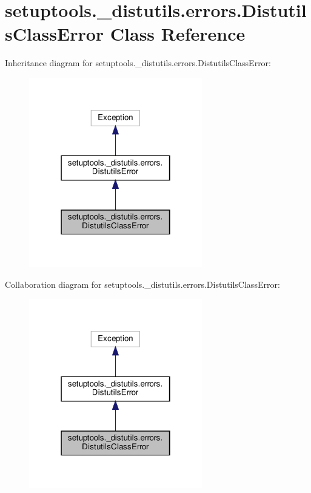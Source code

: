 \hypertarget{classsetuptools_1_1__distutils_1_1errors_1_1DistutilsClassError}{}\section{setuptools.\+\_\+distutils.\+errors.\+Distutils\+Class\+Error Class Reference}
\label{classsetuptools_1_1__distutils_1_1errors_1_1DistutilsClassError}


Inheritance diagram for setuptools.\+\_\+distutils.\+errors.\+Distutils\+Class\+Error\+:
\nopagebreak
\begin{figure}[H]
\begin{center}
\leavevmode
\includegraphics[width=214pt]{classsetuptools_1_1__distutils_1_1errors_1_1DistutilsClassError__inherit__graph}
\end{center}
\end{figure}


Collaboration diagram for setuptools.\+\_\+distutils.\+errors.\+Distutils\+Class\+Error\+:
\nopagebreak
\begin{figure}[H]
\begin{center}
\leavevmode
\includegraphics[width=214pt]{classsetuptools_1_1__distutils_1_1errors_1_1DistutilsClassError__coll__graph}
\end{center}
\end{figure}


